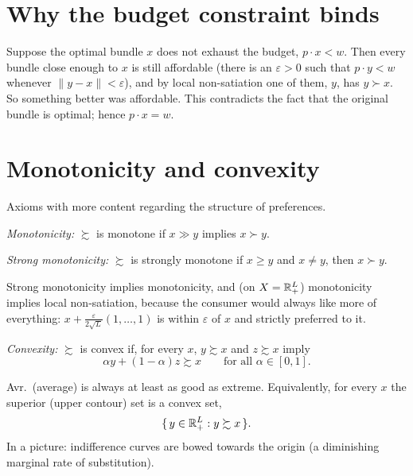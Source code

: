 \documentclass[11pt]{article}
\begin{document}
\section{Why the budget constraint binds}

 Suppose the optimal bundle $x$ does not exhaust the
budget, $p\cdot x<w$. Then every bundle close enough to $x$ is still affordable
(there is an $\varepsilon>0$ such that $p\cdot y<w$ whenever
$\lVert y-x\rVert<\varepsilon$), and by local non-satiation one of them, $y$, has
$y\succ x$. So something better was affordable. This contradicts the fact that the
original bundle is optimal; hence $p\cdot x=w$.


\section{Monotonicity and convexity}

Axioms with more content regarding the structure of preferences.

\begin{flatlist}
  \item \emph{Monotonicity:} $\succsim$ is monotone if $x\gg y$ implies
        $x\succ y$.
  \item \emph{Strong monotonicity:} $\succsim$ is strongly monotone if
        $x\ge y$ and $x\ne y$, then $x\succ y$.
\end{flatlist}

Strong monotonicity implies monotonicity, and (on $X=\mathbb{R}^L_+$) monotonicity implies
local non-satiation, because the consumer would always like more of everything:
$x+\frac{\varepsilon}{2\sqrt{L}}(1,\dots,1)$ is within $\varepsilon$ of $x$ and strictly
preferred to it.

\begin{flatlist}
  \item \emph{Convexity:} $\succsim$ is convex if, for every $x$, $y\succsim x$ and
        $z\succsim x$ imply
        \[ \alpha y+(1-\alpha)z\succsim x\qquad\text{for all }\alpha\in[0,1]. \]
\end{flatlist}

Avr.\ (average) is always at least as good as extreme. Equivalently, for every $x$
the superior (upper contour) set is a convex set,
\[ \{\,y\in\mathbb{R}^L_+ : y\succsim x\,\}. \]
In a picture: indifference curves are bowed towards the origin (a diminishing
marginal rate of substitution).
\end{document}
